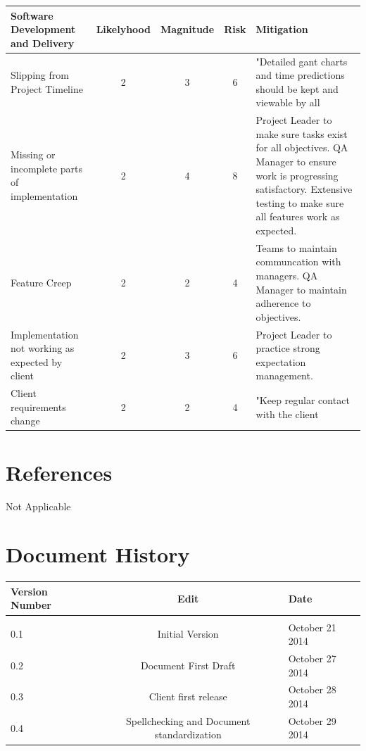 \documentclass[11pt, titlepage]{article}
\begin{document}
\begin{tabular}[]{| p{3cm} | c | c | c | p{5cm} |}
\hline
\textbf{Software Development and Delivery}&\textbf{Likelyhood}&\textbf{Magnitude}&\textbf{Risk}&\textbf{Mitigation} \\ \hline \hline
Slipping from Project Timeline&2&3&6&"Detailed gant charts and time predictions should be kept and viewable by all\\ \hline
Missing or incomplete parts of implementation&2&4&8&Project Leader to make sure tasks exist for all objectives. QA Manager to ensure work is progressing satisfactory. Extensive testing to make sure all features work as expected. \\ \hline
Feature Creep&2&2&4&Teams to maintain communcation with managers. QA Manager to maintain adherence to objectives. \\ \hline
Implementation not working as expected by client&2&3&6&Project Leader to practice strong expectation management. \\ \hline
Client requirements change&2&2&4&"Keep regular contact with the client\\ \hline

\end{tabular}
\clearpage
	\section{References}
		Not Applicable

	\section{Document History}
		\begin{tabular}{l || c | l}
		Version Number & Edit & Date \\ \hline 
		& & \\
		0.1 & Initial Version & October 21 2014 \\
		0.2 & Document First Draft & October 27 2014 \\
		0.3 & Client first release & October 28 2014 \\
		0.4 & Spellchecking and Document standardization & October 29 2014 \\
		
		\end{tabular}
\end{document}
